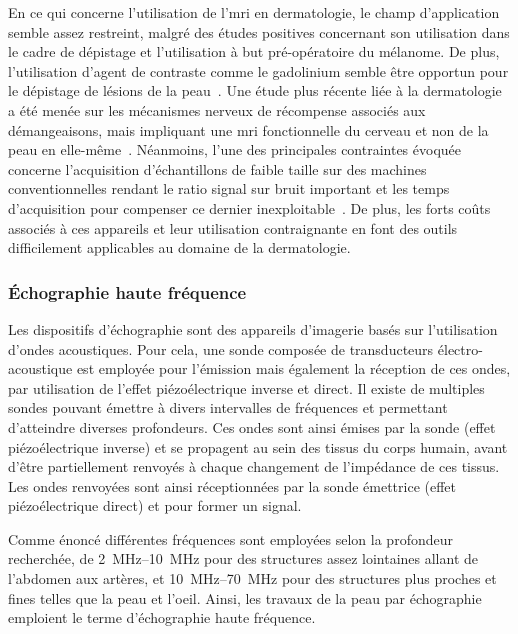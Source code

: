 En ce qui concerne l'utilisation de l'\gls{mri} en dermatologie, le champ d'application semble assez restreint, malgré des études positives concernant son utilisation dans le cadre de dépistage et l'utilisation à but pré-opératoire du mélanome. De plus, l'utilisation d'agent de contraste comme le gadolinium semble être opportun pour le dépistage de lésions de la peau~\cite{Zemtsov1993}. Une étude plus récente liée à la dermatologie a été menée sur les mécanismes nerveux de récompense associés aux démangeaisons, mais impliquant une \gls{mri} fonctionnelle du cerveau et non de la peau en elle-même~\cite{Mueller2017}. Néanmoins, l'une des principales contraintes évoquée concerne l'acquisition d'échantillons de faible taille sur des machines conventionnelles rendant le ratio signal sur bruit important et les temps d'acquisition pour compenser ce dernier inexploitable~\cite{Gobel2016}. De plus, les forts coûts associés à ces appareils et leur utilisation contraignante en font des outils difficilement applicables au domaine de la dermatologie.\par

\subsubsection{Échographie haute fréquence}
Les dispositifs d'échographie sont des appareils d'imagerie basés sur l'utilisation d'ondes acoustiques. Pour cela, une sonde composée de transducteurs électro-acoustique est employée pour l'émission mais également la réception de ces ondes, par utilisation de l'effet piézoélectrique inverse et direct. Il existe de multiples sondes pouvant émettre à divers intervalles de fréquences et permettant d'atteindre diverses profondeurs. Ces ondes sont ainsi émises par la sonde (effet piézoélectrique inverse) et se propagent au sein des tissus du corps humain, avant d'être partiellement renvoyés à chaque changement de l'impédance de ces tissus. Les ondes renvoyées sont ainsi réceptionnées par la sonde émettrice (effet piézoélectrique direct) et pour former un signal.\par

Comme énoncé différentes fréquences sont employées selon la profondeur recherchée, de \SIrange{2}{10}{\mega\hertz} pour des structures assez lointaines allant de l'abdomen aux artères, et \SIrange{10}{70}{\mega\hertz} pour des structures plus proches et fines telles que la peau et l'oeil. Ainsi, les travaux de la peau par échographie emploient le terme d'échographie haute fréquence.\par

